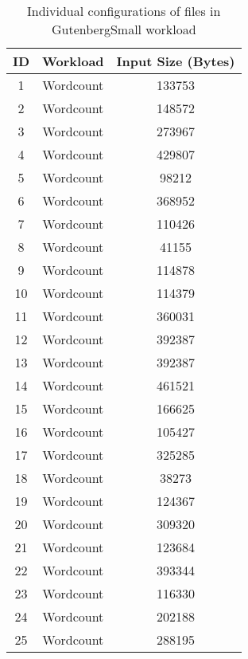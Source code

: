 \documentclass[print,ms]{nuthesis}%
\begin{document}
\begin{table}[h!]
 
\tiny
  \begin{center}
   \begin{threeparttable}
    \caption{Individual configurations of files in GutenbergSmall workload}
    \label{tab:table1}
    \begin{tabular}{c|c|c}%
     \toprule %
      \textbf{ID} & \textbf{Workload} & \textbf{Input Size (Bytes)}\\
      \hline
      1 & Wordcount & 133753 \\
      2 & Wordcount & 148572 \\
      3 & Wordcount & 273967 \\
      4 & Wordcount & 429807  \\
      5 & Wordcount & 98212 \\
      6 & Wordcount & 368952  \\
      7 & Wordcount & 110426  \\
      8 & Wordcount & 41155  \\
      9 & Wordcount & 114878  \\
      10 & Wordcount & 114379  \\
      11 & Wordcount & 360031  \\
      12 & Wordcount & 392387 \\
      13 & Wordcount & 392387  \\
      14 & Wordcount & 461521  \\
      15 & Wordcount & 166625  \\
      16 & Wordcount & 105427  \\
      17 & Wordcount & 325285  \\
      18 & Wordcount & 38273 \\
      19 & Wordcount & 124367 \\
      20 & Wordcount & 309320 \\
      21 & Wordcount & 123684  \\
      22 & Wordcount & 393344  \\
      23 & Wordcount & 116330  \\
      24 & Wordcount & 202188  \\
      25 & Wordcount & 288195  \\

\end{tabular}
\end{threeparttable}
\end{center}
\end{table}
\end{document}
